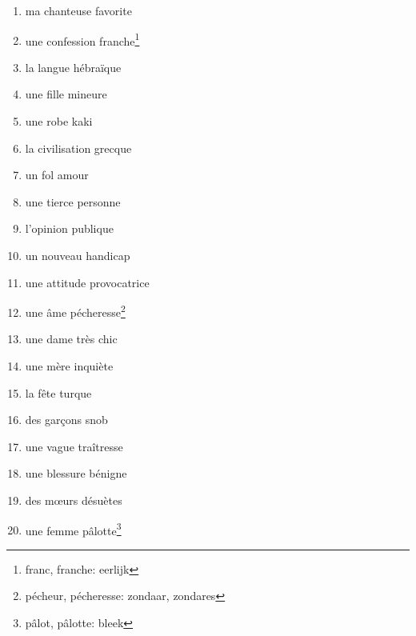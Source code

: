 \documentclass[11pt, french]{report}
\begin{document}
\vfill

\begin{enumerate}
\item ma chanteuse favorite
\item une confession franche\footnote{franc, franche: eerlijk}
\item la langue hébraïque
\item une fille mineure
\item une robe kaki
\item la civilisation grecque
\item un fol amour
\item une tierce personne
\item l'opinion publique
\item un nouveau handicap
\item une attitude provocatrice
\item une âme pécheresse\footnote{pécheur, pécheresse: zondaar, zondares}
\item une dame très chic
\item une mère inquiète
\item la fête turque
\item des garçons snob
\item une vague traîtresse
\item une blessure bénigne
\item des mœurs désuètes
\item une femme pâlotte\footnote{pâlot, pâlotte: bleek}
\end{enumerate}

\vfill
\end{document}
